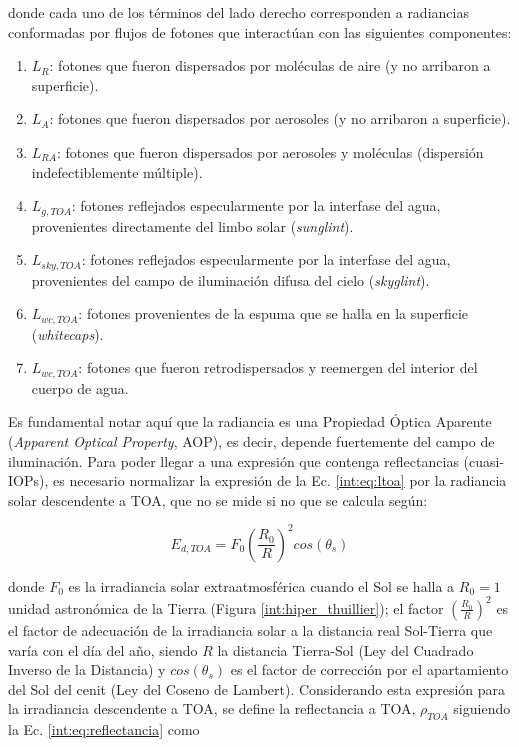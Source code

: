     \noindent donde cada uno de los términos del lado derecho corresponden a radiancias conformadas por flujos de fotones que interactúan con las siguientes componentes:
    
    \begin{enumerate}
        \item $L_{R}$: fotones que fueron dispersados por moléculas de aire (y no arribaron a superficie).
        \item $L_{A}$: fotones que fueron dispersados por aerosoles (y no arribaron a superficie).
        \item $L_{RA}$: fotones que fueron dispersados por aerosoles y moléculas (dispersión indefectiblemente múltiple).
        \item $L_{g,TOA}$: fotones reflejados especularmente por la interfase del agua, provenientes directamente del limbo solar (\textit{sunglint}).
        \item $L_{sky,TOA}$: fotones reflejados especularmente por la interfase del agua, provenientes del campo de iluminación difusa del cielo (\textit{skyglint}).
        \item $L_{wc,TOA}$: fotones provenientes de la espuma que se halla en la superficie (\textit{whitecaps}).
        \item $L_{wc,TOA}$: fotones que fueron retrodispersados y reemergen del interior del cuerpo de agua.
    \end{enumerate}

    Es fundamental notar aquí que la radiancia es una Propiedad Óptica Aparente (\textit{Apparent Optical Property}, AOP), es decir, depende fuertemente del campo de iluminación. Para poder llegar a una expresión que contenga reflectancias (cuasi-IOPs), es necesario normalizar la expresión de la Ec. \ref{int:eq:ltoa} por la radiancia solar descendente a TOA, que no se mide si no que se calcula según:

    \begin{equation}
        E_{d,TOA} = F_{0}\left(\frac{R_{0}}{R}\right)^{2}cos(\theta_{s})
        \label{int:eq:edtoa}
    \end{equation}

    \noindent donde $F_{0}$ es la irradiancia solar extraatmosférica cuando el Sol se halla a $R_{0} = 1$ unidad astronómica de la Tierra (Figura \ref{int:hiper_thuillier}); el factor $\left(\frac{R_{0}}{R}\right)^{2}$ es el factor de adecuación de la irradiancia solar a la distancia real Sol-Tierra que varía con el día del año, siendo $R$ la distancia Tierra-Sol (Ley del Cuadrado Inverso de la Distancia) y $cos(\theta_{s})$ es el factor de corrección por el apartamiento del Sol del cenit (Ley del Coseno de Lambert). Considerando esta expresión para la irradiancia descendente a TOA, se define la reflectancia a TOA, $\rho_{TOA}$ siguiendo la Ec. \ref{int:eq:reflectancia} como

